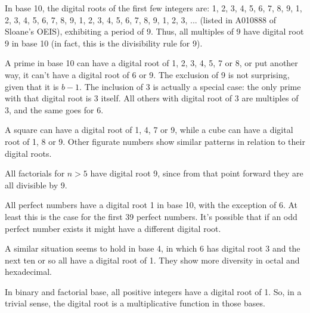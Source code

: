 \documentclass[12pt]{article}
\begin{document}
In base 10, the digital roots of the first few integers are: 1, 2, 3, 4, 5, 6, 7, 8, 9, 1, 2, 3, 4, 5, 6, 7, 8, 9, 1, 2, 3, 4, 5, 6, 7, 8, 9, 1, 2, 3, ... (listed in A010888 of Sloane's OEIS), exhibiting a period of 9. Thus, all multiples of 9 have digital root 9 in base 10 (in fact, this is the divisibility rule for 9).

A prime in base 10 can have a digital root of 1, 2, 3, 4, 5, 7 or 8, or put another way, it can't have a digital root of 6 or 9. The exclusion of 9 is not surprising, given that it is $b - 1$. The inclusion of 3 is actually a special case: the only prime with that digital root is 3 itself. All others with digital root of 3 are multiples of 3, and the same goes for 6.

A square can have a digital root of 1, 4, 7 or 9, while a cube can have a digital root of 1, 8 or 9. Other figurate numbers show similar patterns in relation to their digital roots.

All factorials for $n > 5$ have digital root 9, since from that point forward they are all divisible by 9.

All perfect numbers have a digital root 1 in base 10, with the exception of 6. At least this is the case for the first 39 perfect numbers. It's possible that if an odd perfect number exists it might have a different digital root.

A similar situation seems to hold in base 4, in which 6 has digital root 3 and the next ten or so all have a digital root of 1. They show more diversity in octal and hexadecimal.

In binary and factorial base, all positive integers have a digital root of 1. So, in a trivial sense, the digital root is a multiplicative function in those bases.
\end{document}
